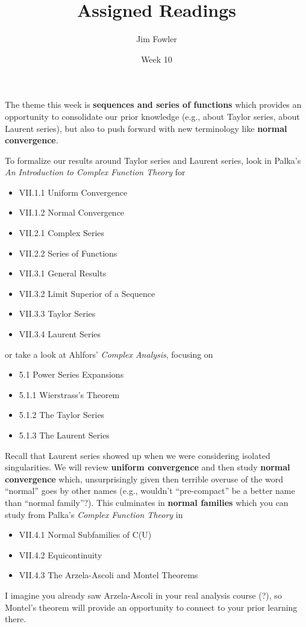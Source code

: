 \documentclass{homework}
\author{Jim Fowler}
\title{Assigned Readings}
\date{Week 10}
\begin{document}
\maketitle

The theme this week is \textbf{sequences and series of functions}
which provides an opportunity to consolidate our prior knowledge
(e.g., about Taylor series, about Laurent series), but also to push
forward with new terminology like \textbf{normal convergence}.

To formalize our results around Taylor series and Laurent series, look
in Palka's \textit{An Introduction to Complex Function Theory} for
\begin{itemize}
\item VII.1.1 Uniform Convergence
\item VII.1.2 Normal Convergence
\item VII.2.1 Complex Series
\item VII.2.2 Series of Functions
\item VII.3.1 General Results
\item VII.3.2 Limit Superior of a Sequence
\item VII.3.3 Taylor Series
\item VII.3.4 Laurent Series
\end{itemize}
or take a look at Ahlfors' \textit{Complex Analysis}, focusing on
\begin{itemize}
\item 5.1 Power Series Expansions
\item 5.1.1 Wierstrass's Theorem
\item 5.1.2 The Taylor Series
\item 5.1.3 The Laurent Series
\end{itemize}
Recall that Laurent series showed up when we were considering isolated
singularities.  We will review \textbf{uniform convergence} and then
study \textbf{normal convergence} which, unsurprisingly given then
terrible overuse of the word ``normal'' goes by other names (e.g.,
wouldn't ``pre-compact'' be a better name than ``normal family''?).
This culminates in \textbf{normal families} which you can study from
Palka's \textit{Complex Function Theory} in
\begin{itemize}  
\item VII.4.1 Normal Subfamilies of C(U)
\item VII.4.2 Equicontinuity
\item VII.4.3 The Arzela-Ascoli and Montel Theorems
\end{itemize}
I imagine you already saw Arzela-Ascoli in your real analysis course
(?), so Montel's theorem will provide an opportunity to connect to
your prior learning there.
\end{document}
